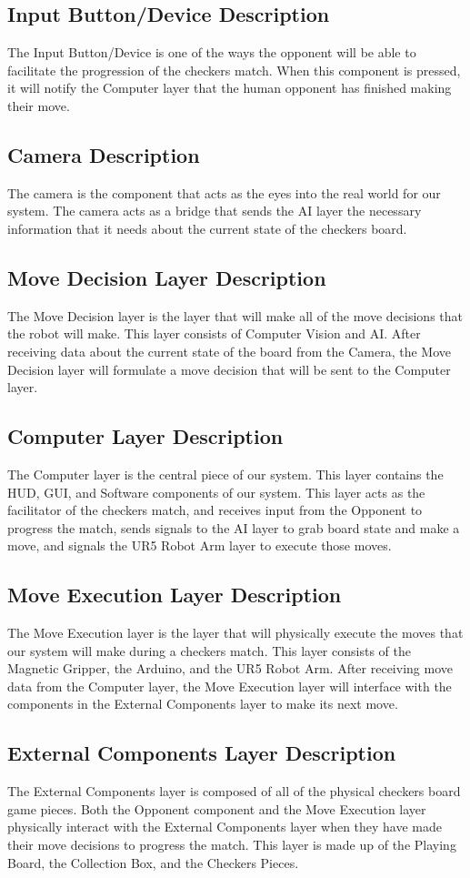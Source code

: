 \subsection{Input Button/Device Description}
The Input Button/Device is one of the ways the opponent will be able to facilitate the progression of the checkers match. When this component is pressed, it will notify the Computer layer that the human opponent has finished making their move.

\subsection{Camera Description}
The camera is the component that acts as the eyes into the real world for our system. The camera acts as a bridge that sends the AI layer the necessary information that it needs about the current state of the checkers board.


\subsection{Move Decision Layer Description}
The Move Decision layer is the layer that will make all of the move decisions that the robot will make. This layer consists of Computer Vision and AI. After receiving data about the current state of the board from the Camera, the Move Decision layer will formulate a move decision that will be sent to the Computer layer.

\subsection{Computer Layer Description}
The Computer layer is the central piece of our system. This layer contains the HUD, GUI, and Software components of our system. This layer acts as the facilitator of the checkers match, and receives input from the Opponent to progress the match, sends signals to the AI layer to grab board state and make a move, and signals the UR5 Robot Arm layer to execute those moves.

\subsection{Move Execution Layer Description}
The Move Execution layer is the layer that will physically execute the moves that our system will make during a checkers match. This layer consists of the Magnetic Gripper, the Arduino, and the UR5 Robot Arm. After receiving move data from the Computer layer, the Move Execution layer will interface with the components in the External Components layer to make its next move.

\subsection{External Components Layer Description}
The External Components layer is composed of all of the physical checkers board game pieces. Both the Opponent component and the Move Execution layer physically interact with the External Components layer when they have made their move decisions to progress the match. This layer is made up of the Playing Board, the Collection Box, and the Checkers Pieces.